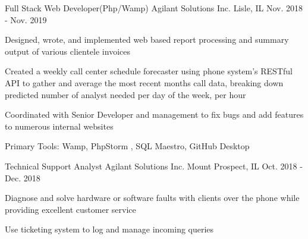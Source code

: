 


\begin{cventries}



\cventry
{ Full Stack Web Developer(Php/Wamp)} %
{Agilant Solutions Inc.} %
{Lisle, IL} %
{Nov. 2018 - Nov. 2019} %
{ %
\begin{cvitems}
\item {Designed, wrote, and implemented web based report processing and summary output of various clientele invoices}
\item {Created a weekly call center schedule forecaster using phone system's RESTful API to gather and average the most recent months call data, breaking down predicted number of analyst needed per day of the week, per hour}
\item {Coordinated with Senior Developer and management to fix bugs and add features to numerous internal websites}
\item {Primary Tools: Wamp, PhpStorm , SQL Maestro, GitHub Desktop}
\end{cvitems}
}

\cventry
{Technical Support Analyst} %
{Agilant Solutions Inc.} %
{Mount Prospect, IL} %
{Oct. 2018 - Dec. 2018} %
{ %
\begin{cvitems}
\item {Diagnose and solve hardware or software faults with clients over the phone while providing excellent customer service}
\item {Use ticketing system to log and manage incoming queries}
\end{cvitems}
}



\end{cventries}